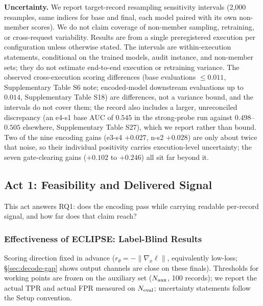 \documentclass[lettersize,journal]{IEEEtran}
\begin{document}
\textbf{Uncertainty.} We report target-record resampling
sensitivity intervals (2{,}000 resamples, same indices for base
and final, each model paired with its own non-member scores).
We do not claim coverage of non-member sampling, retraining, or
cross-request variability. Results are from a single preregistered
execution per configuration unless otherwise stated. The
intervals are within-execution statements, conditional on the
trained models, audit instance, and non-member sets; they do
not estimate end-to-end execution or retraining variance.
The observed cross-execution scoring differences (base
evaluations $\le 0.011$, Supplementary Table S6 note;
encoded-model downstream evaluations up to $0.014$,
Supplementary Table S18) are differences, not a variance
bound, and the intervals do not cover them; the record also
includes a larger, unreconciled discrepancy (an e4-s1 base AUC
of $0.545$ in the strong-probe run against $0.498$--$0.505$
elsewhere, Supplementary Table S27), which we report rather
than bound. Two of the nine encoding gains (e3-s4 $+0.027$,
n-s2 $+0.028$) are only about twice that noise, so their
individual positivity carries execution-level uncertainty;
the seven gate-clearing gains ($+0.102$ to $+0.246$) all sit
far beyond it.
\subsection{Act 1: Feasibility and Delivered Signal}
This act answers RQ1: does the encoding pass while carrying
readable per-record signal, and how far does that claim reach?

\subsubsection{Effectiveness of ECLIPSE: Label-Blind Results}
Scoring direction fixed in advance
($r_\theta = -\|\nabla_x\ell\|$, equivalently low-loss;
\S\ref{sec:decode-gap} shows output channels are
close on these finals). Thresholds for working points are frozen
on the auxiliary set ($N_{\rm aux}$, 100 records); we report
the actual TPR and actual FPR measured on $N_{\rm eval}$;
uncertainty statements follow the Setup convention.
\end{document}
